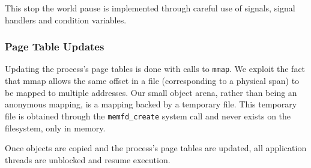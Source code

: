 This stop the world pause is implemented through careful use of
signals, signal handlers and condition variables.

\subsubsection{Page Table Updates}

Updating the process's page tables is done with calls to
\texttt{mmap}.  We exploit the fact that mmap allows the same offset
in a file (corresponding to a physical span) to be mapped to multiple
addresses.  Our small object arena, rather than being an anonymous
mapping, is a mapping backed by a temporary file.  This temporary file
is obtained through the \texttt{memfd\_create} system call and never
exists on the filesystem, only in memory.

Once objects are copied and the process's page tables are updated, all
application threads are unblocked and resume execution.
